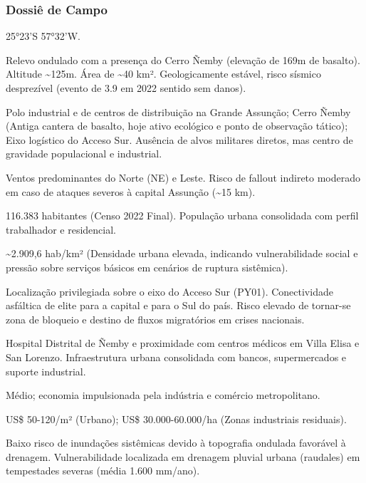 \subsubsection{Dossiê de Campo}
\begin{description}[style=nextline,leftmargin=0.5cm,font=\bfseries]
\item[Coordenadas]  25°23'S 57°32'W.
\item[Topografia]  Relevo ondulado com a presença do Cerro Ñemby (elevação de 169m de basalto). Altitude \textasciitilde 125m. Área de \textasciitilde 40 km². Geologicamente estável, risco sísmico desprezível (evento de 3.9 em 2022 sentido sem danos).
\item[Alvos Estratégicos]  Polo industrial e de centros de distribuição na Grande Assunção; Cerro Ñemby (Antiga cantera de basalto, hoje ativo ecológico e ponto de observação tático); Eixo logístico do Acceso Sur. Ausência de alvos militares diretos, mas centro de gravidade populacional e industrial.
\item[Fallout]  Ventos predominantes do Norte (NE) e Leste. Risco de fallout indireto moderado em caso de ataques severos à capital Assunção (\textasciitilde 15 km).
\item[População]  116.383 habitantes (Censo 2022 Final). População urbana consolidada com perfil trabalhador e residencial.
\item[Densidade]  \textasciitilde 2.909,6 hab/\allowbreak km² (Densidade urbana elevada, indicando vulnerabilidade social e pressão sobre serviços básicos em cenários de ruptura sistêmica).
\item[Vias de Acesso]  Localização privilegiada sobre o eixo do Acceso Sur (PY01). Conectividade asfáltica de elite para a capital e para o Sul do país. Risco elevado de tornar-se zona de bloqueio e destino de fluxos migratórios em crises nacionais.
\item[Serviços]  Hospital Distrital de Ñemby e proximidade com centros médicos em Villa Elisa e San Lorenzo. Infraestrutura urbana consolidada com bancos, supermercados e suporte industrial.
\item[Custo de Vida]  Médio; economia impulsionada pela indústria e comércio metropolitano.
\item[Preço da Terra]  US\$ 50-120/\allowbreak m² (Urbano); US\$ 30.000-60.000/\allowbreak ha (Zonas industriais residuais).
\item[Hidrologia]  Baixo risco de inundações sistêmicas devido à topografia ondulada favorável à drenagem. Vulnerabilidade localizada em drenagem pluvial urbana (raudales) em tempestades severas (média 1.600 mm/\allowbreak ano).

\end{description}
